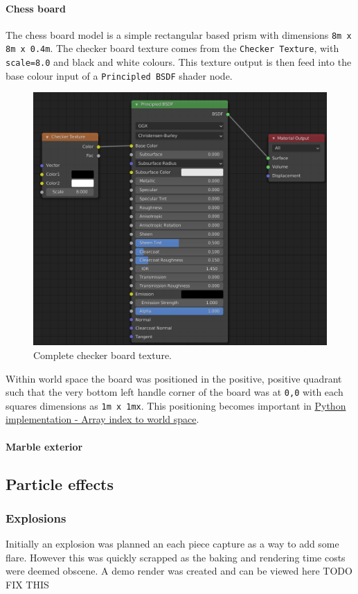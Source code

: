 \documentclass[11pt]{article}
\begin{document}
\paragraph{Chess board}
\label{sec:orgba182e4}
The chess board model is a simple rectangular based prism with dimensions \texttt{8m x
8m x 0.4m}. The checker board texture comes from the \texttt{Checker Texture}, with
\texttt{scale=8.0} and black and white colours. This texture output is then feed into
the base colour input of a \texttt{Principled BSDF} shader node.

\begin{figure}[htbp]
\centering
\includegraphics[width=350pt]{Images/checker texture.png}
\caption{\label{checker-texture}Complete checker board texture.}
\end{figure}

Within world space the board was positioned in the positive, positive quadrant
such that the very bottom left handle corner of the board was at \texttt{0,0}
with each squares dimensions as \texttt{1m x 1mx}. This positioning becomes important
in \hyperref[sec:org789c6c4]{Python implementation - Array index to world space}.
\paragraph{Marble exterior}
\label{sec:org973e6ac}
\subsection{Particle effects}
\label{sec:orgfe36209}
\subsubsection{Explosions}
\label{sec:orgac09548}
Initially an explosion was planned an each piece capture as a way to add some
flare. However this was quickly scrapped as the baking and rendering time costs
were deemed obscene. A demo render was created and can be viewed here TODO FIX
THIS
\end{document}
